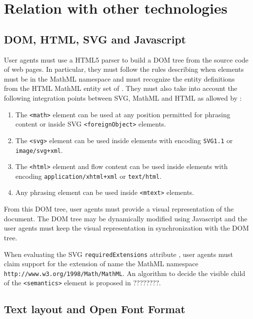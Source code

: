 \section{Relation with other technologies}

\subsection{DOM, HTML, SVG and Javascript}

User agents must use a HTML5 \cite{HTML5} parser to build a DOM tree
\cite{DOM1} from the source code of web pages. In particular, they must follow
the rules describing when elements must be in the MathML namespace and must
recognize the entity definitions from the HTML MathML entity set of
\cite{XMLEntities}. They must also take into account the following integration
points between SVG, MathML and HTML as allowed by \cite{ValidatorSchemas}:

\begin{enumerate}
\item The {\tt <math>} element can be used at any position permitted for
  phrasing content or inside SVG {\tt <foreignObject>} elements.
\item The {\tt <svg>} element can be used inside {\tt <annotation-xml>}
  elements with encoding {\tt SVG1.1} or {\tt image/svg+xml}.
\item The {\tt <html>} element and flow content can be used inside
  {\tt <annotation-xml>} elements with encoding {\tt application/xhtml+xml}
  or {\tt text/html}.
\item Any phrasing element can be used inside {\tt <mtext>} elements.
\end{enumerate}

From this DOM tree, user agents must provide a visual representation of the
document. The DOM tree may be dynamically modified using Javascript
\cite{ECMA262} and the user agents must keep the visual representation in
synchronization with the DOM tree.

When evaluating the SVG {\tt requiredExtensions} attribute \cite{SVG11},
user agents must claim support for the extension of name the MathML namespace
{\tt http://www.w3.org/1998/Math/MathML}. An algorithm to decide the visible
child of the {\tt <semantics>} element is proposed in ????????.

\subsection{Text layout and Open Font Format}

